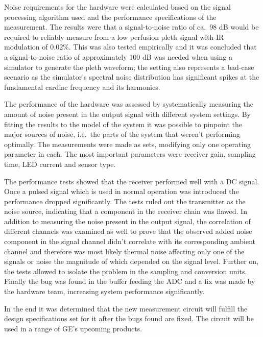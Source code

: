 Noise requirements for the hardware were calculated based on the signal processing algorithm used and the performance specifications of the \spo measurement. The results were that a signal-to-noise ratio of ca.\ 98 dB would be required to reliably measure \spo from a low perfusion pleth signal with IR modulation of 0.02\%. This was also tested empirically and it was concluded that a signal-to-noise ratio of approximately 100 dB was needed when using a simulator to generate the pleth waveform; the setting also represents a bad-case scenario as the simulator's spectral noise distribution has significant spikes at the fundamental cardiac frequency and its harmonics.

The performance of the hardware was assessed by systematically measuring the amount of noise present in the output signal with different system settings. By fitting the results to the model of the system it was possible to pinpoint the major sources of noise, i.e.\ the parts of the system that weren't performing optimally. The measurements were made as sets, modifying only one operating parameter in each. The most important parameters were receiver gain, sampling time, LED current and sensor type.

The performance tests showed that the receiver performed well with a DC signal. Once a pulsed signal which is used in normal operation was introduced the performance dropped significantly. The tests ruled out the transmitter as the noise source, indicating that a component in the receiver chain was flawed. In addition to measuring the noise present in the output signal, the correlation of different channels was examined as well to prove that the observed added noise component in the signal channel didn't correlate with its corresponding ambient channel and therefore was most likely thermal noise affecting only one of the signals or noise the magnitude of which depended on the signal level. Further on, the tests allowed to isolate the problem in the sampling and conversion units. Finally the bug was found in the buffer feeding the ADC and a fix was made by the hardware team, increasing system performance significantly.

In the end it was determined that the new measurement circuit will fulfill the design specifications set for it after the bugs found are fixed. The circuit will be used in a range of GE's upcoming products.